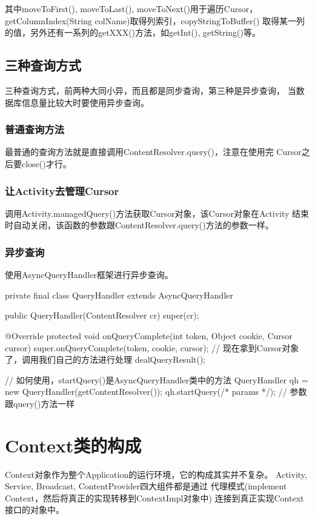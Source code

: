﻿\documentclass[a4paper,11pt]{article}
\begin{document}
其中moveToFirst(), moveToLast(), moveToNext()用于遍历Cursor，
getColumnIndex(String colName)取得列索引，copyStringToBuffer()
取得某一列的值，另外还有一系列的getXXX()方法，如getInt(), getString()等。

\subsection[三种查询方式]{三种查询方式}
三种查询方式，前两种大同小异，而且都是同步查询，第三种是异步查询，
当数据库信息量比较大时要使用异步查询。

\subsubsection[普通查询方法]{普通查询方法}
最普通的查询方法就是直接调用ContentResolver.query()，注意在使用完
Cursor之后要close()才行。

\subsubsection[让Activity去管理Cursor]{让Activity去管理Cursor}
调用Activity.managedQuery()方法获取Cursor对象，该Cursor对象在Activity
结束时自动关闭，该函数的参数跟ContentResolver.query()方法的参数一样。

\subsubsection[异步查询]{异步查询}
使用AsyncQueryHandler框架进行异步查询。

\begin{javacode}
private final class QueryHandler extends AsyncQueryHandler {  
    public QueryHandler(ContentResolver cr) {  
        super(cr);  
    }  
  
    @Override  
    protected void onQueryComplete(int token, Object cookie, Cursor cursor) {  
        super.onQueryComplete(token, cookie, cursor);  
        // 现在拿到Cursor对象了，调用我们自己的方法进行处理
        dealQueryResult();
    }  
}

// 如何使用，startQuery()是AsyncQueryHandler类中的方法
QueryHandler qh = new QueryHandler(getContentResolver());
qh.startQuery(/* params */); // 参数跟query()方法一样
\end{javacode}


\section[Context类的构成]{Context类的构成}
Context对象作为整个Application的运行环境，它的构成其实并不复杂。
Activity, Service, Broadcast, ContentProvider四大组件都是通过
代理模式(implement Context，然后将真正的实现转移到ContextImpl对象中)
连接到真正实现Context接口的对象中。
\end{document}
